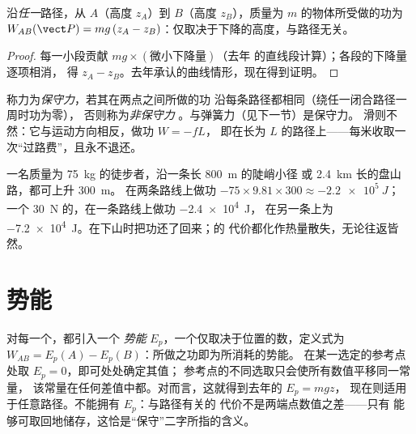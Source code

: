 \begin{proposition}\label{prop:g12:work-and-energy:weight}
沿\emph{任一}路径，从 $A$（高度 $z_A$）到 $B$（高度
$z_B$），质量为 $m$ 的物体所受做的功为
$W_{AB}(\vect P) = mg\,(z_A - z_B)$：仅取决于下降的高度，与路径无关。
\end{proposition}

\begin{proof}
每一小段贡献 $mg \times (\text{微小下降量})$（去年
的直线段计算）；各段的下降量逐项相消，
得 $z_A - z_B$。去年承认的曲线情形，现在得到证明。
\end{proof}

\begin{definition}[保守力与非保守力]\label{def:g12:work-and-energy:conservative}
称力为\emph{保守力}，若其在两点之间所做的功
沿每条路径都相同（绕任一闭合路径一周时功为零），
否则称为\emph{非保守力}
。与弹簧力（见下一节）是保守力。
滑则不然：它与运动方向相反，做功 $W = -fL$，
即在长为 $L$ 的路径上——每米收取一次“过路费”，且永不退还。
\end{definition}

\begin{example}[通往小屋的两条路线]\label{ex:g12:work-and-energy:trails}
一名质量为 \qty{75}{kg} 的徒步者，沿一条长 \qty{800}{m} 的陡峭小径
或 \qty{2.4}{km} 长的盘山路，都可上升 \qty{300}{m}。
在两条路线上做功 $-75 \times 9.81 \times 300 \approx \qty{-2.2e5}{J}$；
一个 \qty{30}{N} 的，在一条路线上做功 \qty{-2.4e4}{J}，
在另一条上为 \qty{-7.2e4}{J}。在下山时把功还了回来；的
代价都化作热量散失，无论往返皆然。
\end{example}

\section{势能}

\begin{definition}[势能]\label{def:g12:work-and-energy:ep}
对每一个，都引入一个
\emph{势能}
$E_p$，一个仅取决于位置的数，定义式为
$W_{AB} = E_p(A) - E_p(B)$：所做之功即为所消耗的势能。
在某一选定的参考点处取 $E_p = 0$，即可处处确定其值；
参考点的不同选取只会使所有数值平移同一常量，
该常量在任何差值中都。对而言，这就得到去年的 $E_p = mgz$，
现在则适用于任意路径。不能拥有 $E_p$：与路径有关的
代价不是两端点数值之差——只有
能够可取回地储存，这恰是“保守”二字所指的含义。
\end{definition}

